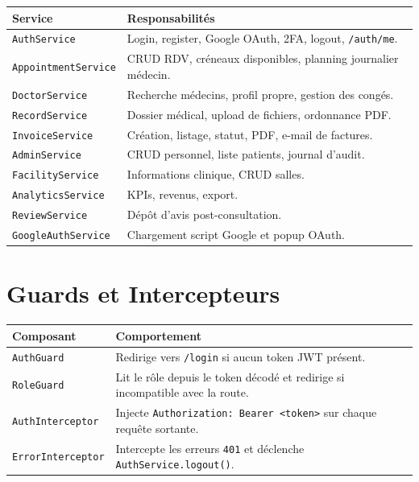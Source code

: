 \documentclass[12pt,a4paper]{report}
\begin{document}
\begin{center}
\small
\begin{tabularx}{\textwidth}{@{} l X @{}}
  \toprule
  \textbf{Service} & \textbf{Responsabilités} \\
  \midrule
  \texttt{AuthService}        & Login, register, Google OAuth, 2FA, logout, \texttt{/auth/me}. \\
  \texttt{AppointmentService} & CRUD RDV, créneaux disponibles, planning journalier médecin. \\
  \texttt{DoctorService}      & Recherche médecins, profil propre, gestion des congés. \\
  \texttt{RecordService}      & Dossier médical, upload de fichiers, ordonnance PDF. \\
  \texttt{InvoiceService}     & Création, listage, statut, PDF, e-mail de factures. \\
  \texttt{AdminService}       & CRUD personnel, liste patients, journal d'audit. \\
  \texttt{FacilityService}    & Informations clinique, CRUD salles. \\
  \texttt{AnalyticsService}   & KPIs, revenus, export. \\
  \texttt{ReviewService}      & Dépôt d'avis post-consultation. \\
  \texttt{GoogleAuthService}  & Chargement script Google et popup OAuth. \\
  \bottomrule
\end{tabularx}
\end{center}

\section{Guards et Intercepteurs}

\begin{center}
\small
\begin{tabularx}{\textwidth}{@{} l X @{}}
  \toprule
  \textbf{Composant} & \textbf{Comportement} \\
  \midrule
  \texttt{AuthGuard}       & Redirige vers \texttt{/login} si aucun token JWT présent. \\
  \texttt{RoleGuard}       & Lit le rôle depuis le token décodé et redirige si incompatible avec la route. \\
  \texttt{AuthInterceptor} & Injecte \texttt{Authorization: Bearer <token>} sur chaque requête sortante. \\
  \texttt{ErrorInterceptor}& Intercepte les erreurs \texttt{401} et déclenche \texttt{AuthService.logout()}. \\
  \bottomrule
\end{tabularx}
\end{center}
\end{document}
